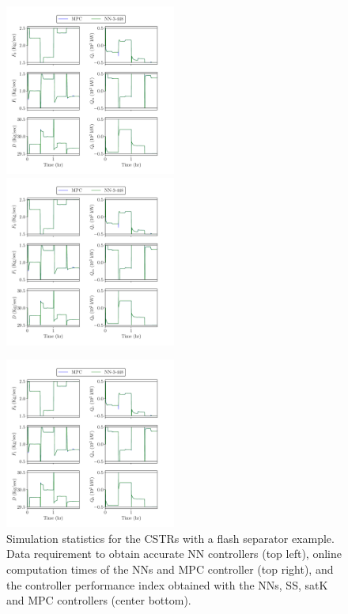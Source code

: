 \documentclass[preprint,5p, twocolumn, authoryear]{elsarticle}
\begin{document}
\begin{figure}[!h]
    \includegraphics[page=31,
        width=0.5\textwidth, 
        height=0.28\textheight]{cstrs_comparision_plots.pdf} \hfill
    \includegraphics[page=34,
        width=0.5\textwidth, 
        height=0.28\textheight]{cstrs_comparision_plots.pdf} \vfill
    \vspace{-0.1in}
    \begin{center}\includegraphics[page=33,
        width=0.5\textwidth, 
        height=0.28\textheight]{cstrs_comparision_plots.pdf}
    \end{center}
    \vspace{-0.2in}
    \caption{Simulation statistics for the  
    CSTRs with a flash separator example. Data requirement to obtain accurate NN controllers (top left), online computation times of the NNs and 
    MPC controller (top right), 
    and the controller performance index obtained with the NNs, 
    SS, satK and MPC controllers (center bottom).}	
    \label{fig:cstrs_statistics}
\end{figure}
\end{document}
